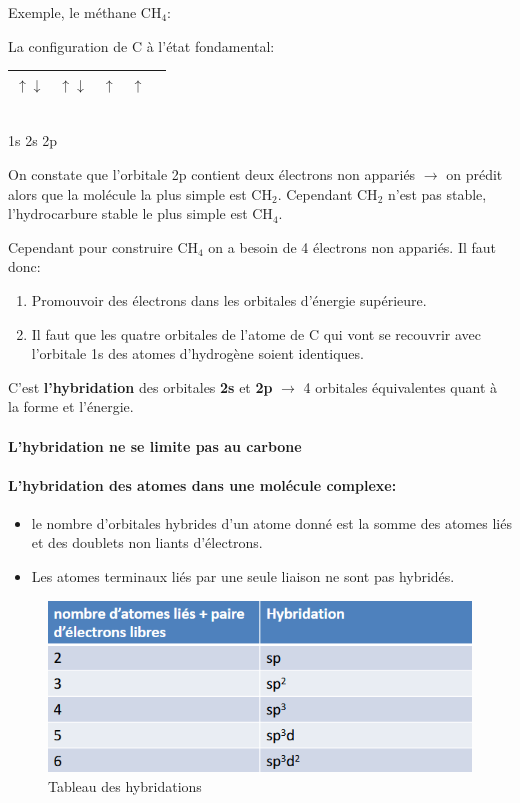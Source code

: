 \documentclass[10pt,a4paper]{book}
\begin{document}
Exemple, le méthane CH$_4$:
\begin{center}
La configuration de C à l'état fondamental: \\ \vspace{0.5cm}
\begin{tabular}{| c | c | c | c | c |}
\hline
$\uparrow\downarrow$ & $\uparrow\downarrow$ & $\uparrow$ & $\uparrow$  & \: \\
\hline
\end{tabular}\\
1s \quad 2s \quad \qquad 2p
\end{center}
\par On constate que l'orbitale 2p contient deux électrons non appariés $\rightarrow$ on prédit alors que la molécule la plus simple est CH$_2$. Cependant CH$_2$ n'est pas stable, l'hydrocarbure stable le plus simple est CH$_4$. \par
Cependant pour construire CH$_4$ on a besoin de 4 électrons non appariés. Il faut donc:
\begin{enumerate}
\item Promouvoir des électrons dans les orbitales d'énergie supérieure.
\item Il faut que les quatre orbitales de l’atome de C qui vont se recouvrir avec l’orbitale 1s des atomes d’hydrogène soient identiques.
\end{enumerate}
C'est \textbf{l'hybridation} des orbitales \textbf{2s} et \textbf{2p} $\rightarrow$ 4 orbitales équivalentes quant à la forme et l'énergie.
\paragraph{L'hybridation ne se limite pas au carbone} %
\paragraph{L'hybridation des atomes dans une molécule complexe:}
\begin{itemize}
\item le nombre d’orbitales hybrides d’un atome donné est la somme des atomes liés et des doublets non liants d’électrons.
\item Les atomes terminaux liés par une seule liaison ne sont pas hybridés.
\end{itemize}
\begin{figure}[h!]
\begin{center}
\includegraphics[scale=0.65]{./assets/hybridation_table.png}
\caption{Tableau des hybridations}
\label{fig:hybridation_table}
\end{center}
\end{figure}
\end{document}
